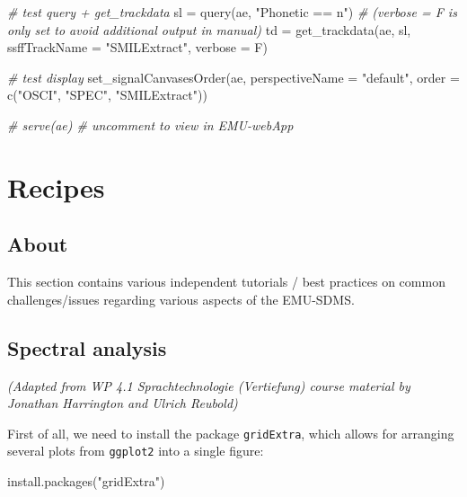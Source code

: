 \documentclass[
]{book}
\newenvironment{Shaded}{\begin{snugshade}}{\end{snugshade}}
\newcommand{\AttributeTok}[1]{\textcolor[rgb]{0.77,0.63,0.00}{#1}}
\newcommand{\CommentTok}[1]{\textcolor[rgb]{0.56,0.35,0.01}{\textit{#1}}}
\newcommand{\FunctionTok}[1]{\textcolor[rgb]{0.00,0.00,0.00}{#1}}
\newcommand{\NormalTok}[1]{#1}
\newcommand{\OtherTok}[1]{\textcolor[rgb]{0.56,0.35,0.01}{#1}}
\newcommand{\StringTok}[1]{\textcolor[rgb]{0.31,0.60,0.02}{#1}}
\begin{document}
\begin{Shaded}
\begin{Highlighting}[]
\CommentTok{\# test query + get\_trackdata}
\NormalTok{sl }\OtherTok{=} \FunctionTok{query}\NormalTok{(ae, }\StringTok{"Phonetic == n"}\NormalTok{)}
\CommentTok{\# (verbose = F is only set to avoid additional output in manual)}
\NormalTok{td }\OtherTok{=} \FunctionTok{get\_trackdata}\NormalTok{(ae,}
\NormalTok{                   sl,}
                   \AttributeTok{ssffTrackName =} \StringTok{"SMILExtract"}\NormalTok{,}
                   \AttributeTok{verbose =}\NormalTok{ F)}

\CommentTok{\# test display}
\FunctionTok{set\_signalCanvasesOrder}\NormalTok{(ae,}
                        \AttributeTok{perspectiveName =} \StringTok{"default"}\NormalTok{,}
                        \AttributeTok{order =} \FunctionTok{c}\NormalTok{(}\StringTok{"OSCI"}\NormalTok{, }\StringTok{"SPEC"}\NormalTok{, }\StringTok{"SMILExtract"}\NormalTok{))}

\CommentTok{\# serve(ae) \# uncomment to view in EMU{-}webApp}
\end{Highlighting}
\end{Shaded}

\hypertarget{part-recipes}{%
\part{Recipes}\label{part-recipes}}

\hypertarget{about}{%
\chapter{About}\label{about}}

This section contains various independent tutorials / best practices on common challenges/issues regarding various aspects of the EMU-SDMS.

\hypertarget{recipe:spectralAnalysis}{%
\chapter{Spectral analysis}\label{recipe:spectralAnalysis}}

\emph{(Adapted from WP 4.1 Sprachtechnologie (Vertiefung) course material by Jonathan Harrington and Ulrich Reubold)}

First of all, we need to install the package \texttt{gridExtra}, which allows for arranging several plots from \texttt{ggplot2} into a single figure:

\begin{Shaded}
\begin{Highlighting}[]
\FunctionTok{install.packages}\NormalTok{(}\StringTok{"gridExtra"}\NormalTok{)}
\end{Highlighting}
\end{Shaded}
\end{document}

